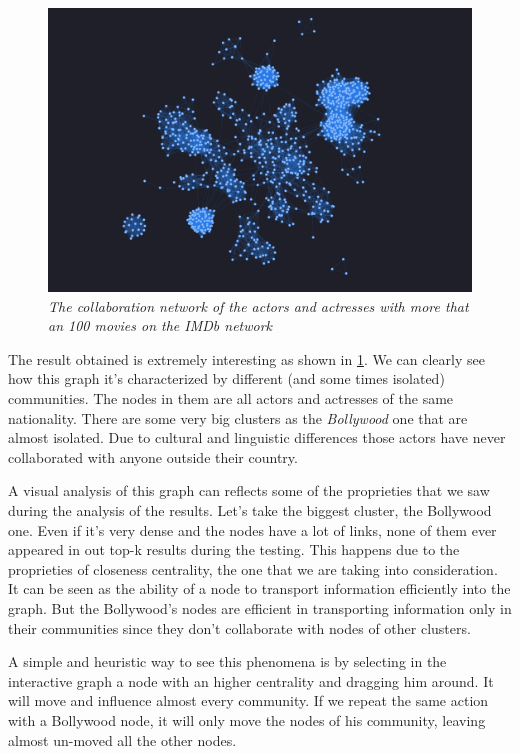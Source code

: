 \begin{center}
    \s \nd {}
\end{center}

\begin{figure}[H]
    \centering
    \includegraphics[width=12cm]{Screenshot.png}
    \caption{\emph{The collaboration network of the actors and actresses with more that an 100 movies on the IMDb network}}
    \label{fig:imdb-a-network}

\end{figure}

The result obtained is extremely interesting as shown in \ref{fig:imdb-a-network}. We can clearly see how this graph it's characterized by different (and some times isolated) communities. The nodes in them are all actors and actresses of the same nationality. There are some very big clusters as the \emph{Bollywood} one that are almost isolated. Due to cultural and linguistic differences those actors have never collaborated with anyone outside their country. \s

A visual analysis of this graph can reflects some of the proprieties that we saw during the analysis of the results. Let's take the biggest cluster, the Bollywood one. Even if it's very dense and the nodes have a lot of links, none of them ever appeared in out top-k results during the testing. This happens due to the proprieties of closeness centrality, the one that we are taking into consideration. It can be seen as the ability of a node to transport information efficiently into the graph. But the Bollywood's nodes are efficient in transporting information only in their communities since they don't collaborate with nodes of other clusters. \s

A simple and heuristic way to see this phenomena is by selecting in the interactive graph a node with an higher centrality and dragging him around. It will move and influence almost every community. If we repeat the same action with a Bollywood node, it will only move the nodes of his community, leaving almost un-moved all the other nodes.


